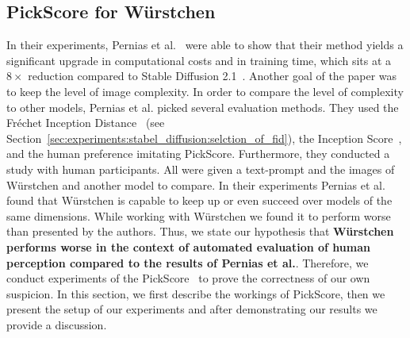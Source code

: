 \subsection{PickScore for W\"urstchen}
In their experiments, Pernias et al.~\cite{pernias2024wrstchen} were able to show
that their method yields a significant upgrade in computational costs and in
training time, which sits at a $8\times$ reduction compared to Stable Diffusion
2.1~\cite{rombach2023sd_2_1}. Another goal of the paper was to keep the level of
image complexity. In order to compare the level of complexity to other models,
Pernias et al. picked several evaluation methods. They used the
Fr\'echet Inception Distance~\cite{heusel2018ganstrainedtimescaleupdate} (see
Section~\ref{sec:experiments:stabel_diffusion:selction_of_fid}), the Inception
Score~\cite{ding2021cogviewmasteringtexttoimagegeneration}, and the human preference imitating
PickScore. Furthermore, they conducted a study with human participants. All were
given a text-prompt and the images of W\"urstchen and another model to compare.
In their experiments Pernias et al. found that W\"urstchen is capable to keep up or
even succeed over models of the same dimensions. While working with W\"urstchen
we found it to perform worse than presented by the authors. Thus, we
state our hypothesis that \textbf{W\"urstchen performs worse in the context of
    automated evaluation of human perception compared to the results of Pernias et al.}. Therefore, we
conduct experiments of the PickScore~\cite{kirstain2023pickapic} to
prove the correctness of our own suspicion. In this section, we first describe
the workings of PickScore, then we present the setup of our experiments and
after demonstrating our results we provide a discussion.

